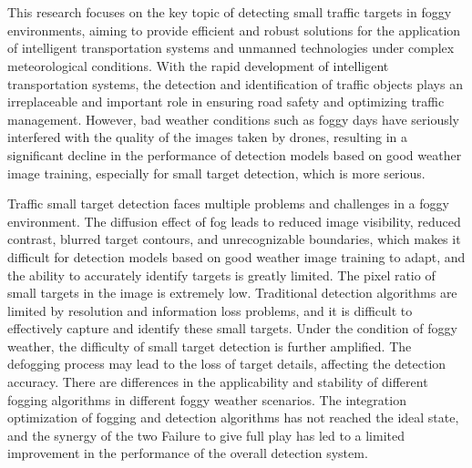\section*{\ArticleTitleEn}
\begin{enabstract}
\fontsize{14pt}{17.5pt}\selectfont %

This research focuses on the key topic of detecting small traffic targets in foggy environments, aiming to provide efficient and robust solutions for the application of intelligent transportation systems and unmanned technologies under complex meteorological conditions. With the rapid development of intelligent transportation systems, the detection and identification of traffic objects plays an irreplaceable and important role in ensuring road safety and optimizing traffic management. However, bad weather conditions such as foggy days have seriously interfered with the quality of the images taken by drones, resulting in a significant decline in the performance of detection models based on good weather image training, especially for small target detection, which is more serious.

Traffic small target detection faces multiple problems and challenges in a foggy environment. The diffusion effect of fog leads to reduced image visibility, reduced contrast, blurred target contours, and unrecognizable boundaries, which makes it difficult for detection models based on good weather image training to adapt, and the ability to accurately identify targets is greatly limited. The pixel ratio of small targets in the image is extremely low. Traditional detection algorithms are limited by resolution and information loss problems, and it is difficult to effectively capture and identify these small targets. Under the condition of foggy weather, the difficulty of small target detection is further amplified. The defogging process may lead to the loss of target details, affecting the detection accuracy. There are differences in the applicability and stability of different fogging algorithms in different foggy weather scenarios. The integration optimization of fogging and detection algorithms has not reached the ideal state, and the synergy of the two Failure to give full play has led to a limited improvement in the performance of the overall detection system.


\end{enabstract}
